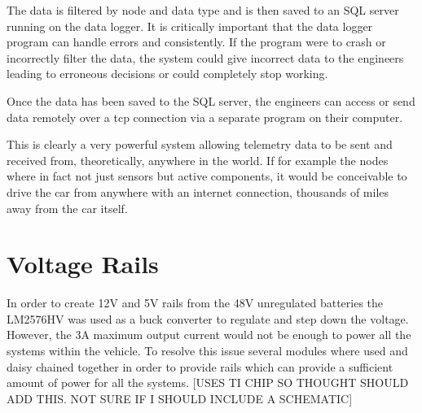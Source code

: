 \documentclass[10pt,a4paper]{article}
\begin{document}
The data is filtered by node and data type and is then saved to an SQL server running on the data logger. It is critically important that the data logger program can handle errors and consistently. If the program were to crash or incorrectly filter the data, the system could give incorrect data to the engineers leading to erroneous decisions or could completely stop working.

Once the data has been saved to the SQL server, the engineers can access or send data remotely over a tcp connection via a separate program on their computer.

This is clearly a very powerful system allowing telemetry data to be sent and received from, theoretically,  anywhere in the world. If for example the nodes where in fact not just sensors but active components, it would be conceivable to drive the car from anywhere with an internet connection, thousands of miles away from the car itself.

\section{Voltage Rails}
In order to create 12V and 5V rails from the 48V unregulated batteries the LM2576HV was used as a buck converter to regulate and step down the voltage. However, the 3A maximum output current would not be enough to power all the systems within the vehicle. To resolve this issue several modules where used and daisy chained together in order to provide rails which can provide a sufficient amount of power for all the systems. [USES TI CHIP SO THOUGHT SHOULD ADD THIS. NOT SURE IF I SHOULD INCLUDE A SCHEMATIC] 
\end{document}
